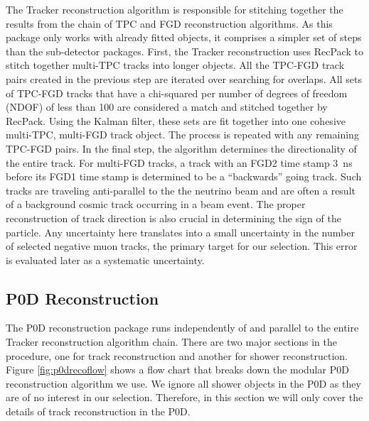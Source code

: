 The Tracker reconstruction algorithm is responsible for stitching together the results from the chain of TPC and FGD reconstruction algorithms. As this package only works with already fitted objects, it comprises a simpler set of steps than the sub-detector packages. First, the Tracker reconstruction uses RecPack to stitch together multi-TPC tracks into longer objects. All the TPC-FGD track pairs created in the previous step are iterated over searching for overlaps. All sets of TPC-FGD tracks that have a chi-squared per number of degrees of freedom (NDOF) of less than 100 are considered a match and stitched together by RecPack. Using the Kalman filter, these sets are fit together into one cohesive multi-TPC, multi-FGD track object. The process is repeated with any remaining TPC-FGD pairs. In the final step, the algorithm determines the directionality of the entire track. For multi-FGD tracks, a track with an FGD2 time stamp 3~ns before its FGD1 time stamp is determined to be a ``backwards'' going track. Such tracks are traveling anti-parallel to the the neutrino beam and are often a result of a background cosmic track occurring in a beam event. The proper reconstruction of track direction is also crucial in determining the sign of the particle. Any uncertainty here translates into a small uncertainty in the number of selected negative muon tracks, the primary target for our selection. This error is evaluated later as a systematic uncertainty.

\subsection{P0D Reconstruction}
\label{sec:p0drecon}

The P0D reconstruction package runs independently of and parallel to the entire Tracker reconstruction algorithm chain. There are two major sections in the procedure, one for track reconstruction and another for shower reconstruction. Figure \ref{fig:p0drecoflow} shows a flow chart that breaks down the modular P0D reconstruction algorithm we use. We ignore all shower objects in the P0D as they are of no interest in our selection. Therefore, in this section we will only cover the details of track reconstruction in the P0D. 

